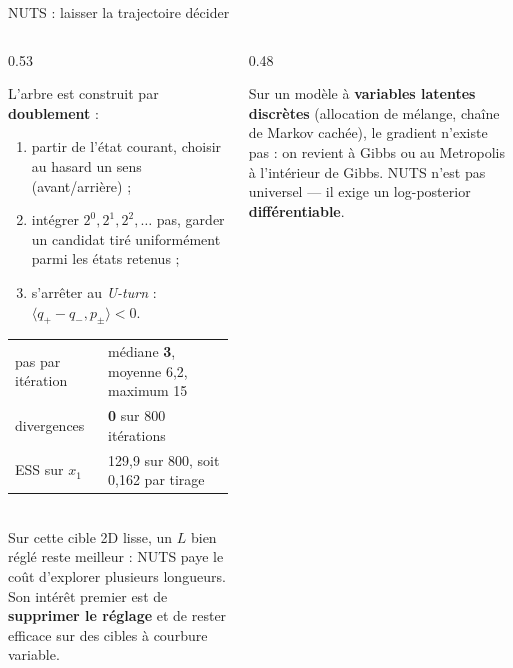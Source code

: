 \begin{frame}{NUTS : laisser la trajectoire décider}
\footnotesize
\begin{columns}[t]
\begin{column}{0.53\textwidth}
\begin{ebox}
L'arbre est construit par \textbf{doublement} :
\begin{enumerate}
  \item partir de l'état courant, choisir au hasard un sens (avant/arrière) ;
  \item intégrer $2^0, 2^1, 2^2, \dots$ pas, garder un candidat tiré uniformément
        parmi les états retenus ;
  \item s'arrêter au \emph{U-turn} : $\langle q_+ - q_-, p_\pm \rangle < 0$.
\end{enumerate}
\end{ebox}
\begin{kbox}
\begin{tabular}{@{}ll@{}}
\toprule
pas par itération & médiane \textbf{3}, moyenne 6,2, maximum 15 \\
divergences & \textbf{0} sur 800 itérations \\
ESS sur $x_1$ & 129,9 sur 800, soit 0,162 par tirage \\
\bottomrule
\end{tabular}
\vspace{1mm}
\\ Sur cette cible 2D lisse, un $L$ bien réglé reste meilleur : NUTS paye le coût
d'explorer plusieurs longueurs. Son intérêt premier est de \textbf{supprimer le
réglage} et de rester efficace sur des cibles à courbure variable.
\end{kbox}
\end{column}
\begin{column}{0.48\textwidth}
\begin{qbox}
Sur un modèle à \textbf{variables latentes discrètes} (allocation de mélange,
chaîne de Markov cachée), le gradient n'existe pas : on revient à Gibbs ou au
Metropolis à l'intérieur de Gibbs. NUTS n'est pas universel --- il exige un
log-posterior \textbf{différentiable}.
\end{qbox}
\end{column}
\end{columns}
\end{frame}


